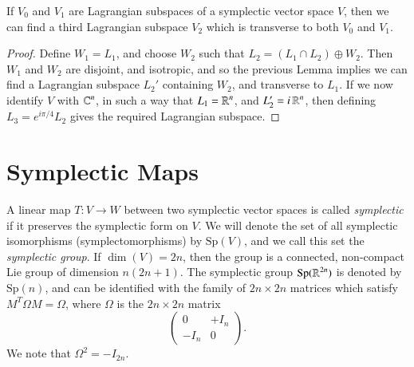 \begin{lemma}
    If $V_0$ and $V_1$ are Lagrangian subspaces of a symplectic vector space $V$, then we can find a third Lagrangian subspace $V_2$ which is transverse to both $V_0$ and $V_1$.
\end{lemma}
\begin{proof}
    Define $W_1 = L_1$, and choose $W_2$ such that $L_2 = (L_1 \cap L_2) \oplus W_2$. Then $W_1$ and $W_2$ are disjoint, and isotropic, and so the previous Lemma implies we can find a Lagrangian subspace $L_2'$ containing $W_2$, and transverse to $L_1$. If we now identify $V$ with $\operatorname{\mathbb{C}}^n$, in such a way that $L_1 = \operatorname{\mathbb{R}}^n$, and $L_2' = i \operatorname{\mathbb{R}}^n$, then defining $L_3 = e^{i \pi / 4} L_2$ gives the required Lagrangian subspace.
\end{proof}

\section{Symplectic Maps}

A linear map $T: V \to W$ between two symplectic vector spaces is called \emph{symplectic} if it preserves the symplectic form on $V$. We will denote the set of all symplectic isomorphisms (symplectomorphisms) by $\text{Sp}(V)$, and we call this set the \emph{symplectic group}. If $\dim(V) = 2n$, then the group is a connected, non-compact Lie group of dimension $n(2n+1)$. The symplectic group $\text{Sp}(\operatorname{\mathbb{R}}^{2n})$ is denoted by $\text{Sp}(n)$, and can be identified with the family of $2n \times 2n$ matrices which satisfy $M^T \Omega M = \Omega$, where $\Omega$ is the $2n \times 2n$ matrix
%
\[ \begin{pmatrix} 0 & +I_n \\ -I_n & 0 \end{pmatrix}. \]
%
We note that $\Omega^2 = - I_{2n}$.

